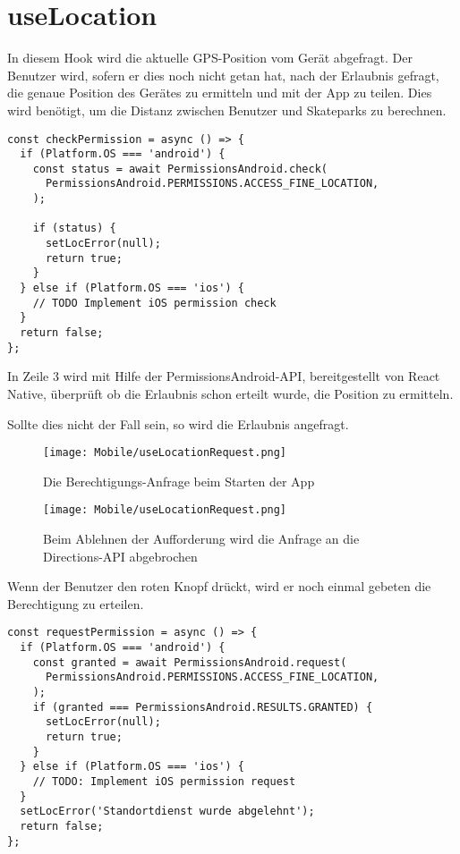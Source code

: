 \section{useLocation}
In diesem Hook wird die aktuelle GPS-Position vom Gerät abgefragt. Der Benutzer wird, sofern er dies
noch nicht getan hat, nach der Erlaubnis gefragt, die genaue Position des Gerätes zu ermitteln und
mit der App zu teilen. Dies wird benötigt, um die Distanz zwischen Benutzer und Skateparks zu
berechnen.

\begin{lstlisting}
const checkPermission = async () => {
  if (Platform.OS === 'android') {
    const status = await PermissionsAndroid.check(
      PermissionsAndroid.PERMISSIONS.ACCESS_FINE_LOCATION,
    );

    if (status) {
      setLocError(null);
      return true;
    }
  } else if (Platform.OS === 'ios') {
    // TODO Implement iOS permission check
  }
  return false;
};
\end{lstlisting}

In Zeile 3 wird mit Hilfe der PermissionsAndroid-API, bereitgestellt von React Native, überprüft
ob die Erlaubnis schon erteilt wurde, die Position zu ermitteln.

Sollte dies nicht der Fall sein, so wird die Erlaubnis angefragt.

\begin{figure}[H]
  \begin{center}
    \texttt{[image: Mobile/useLocationRequest.png]}
    \caption{Die Berechtigungs-Anfrage beim Starten der App}
  \end{center}
\end{figure}

\begin{figure}[H]
  \begin{center}
    \texttt{[image: Mobile/useLocationRequest.png]}
    \caption{Beim Ablehnen der Aufforderung wird die Anfrage an die Directions-API abgebrochen}
  \end{center}
\end{figure}

Wenn der Benutzer den roten Knopf drückt, wird er noch einmal gebeten die Berechtigung zu erteilen.

\begin{lstlisting}
const requestPermission = async () => {
  if (Platform.OS === 'android') {
    const granted = await PermissionsAndroid.request(
      PermissionsAndroid.PERMISSIONS.ACCESS_FINE_LOCATION,
    );
    if (granted === PermissionsAndroid.RESULTS.GRANTED) {
      setLocError(null);
      return true;
    }
  } else if (Platform.OS === 'ios') {
    // TODO: Implement iOS permission request
  }
  setLocError('Standortdienst wurde abgelehnt');
  return false;
};
\end{lstlisting}

